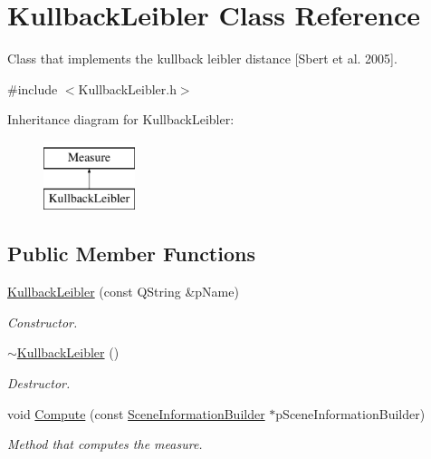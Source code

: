 \hypertarget{class_kullback_leibler}{\section{Kullback\+Leibler Class Reference}
\label{class_kullback_leibler}
}


Class that implements the kullback leibler distance \mbox{[}Sbert et al. 2005\mbox{]}.  




{\ttfamily \#include $<$Kullback\+Leibler.\+h$>$}

Inheritance diagram for Kullback\+Leibler\+:\begin{figure}[H]
\begin{center}
\leavevmode
\includegraphics[height=2.000000cm]{class_kullback_leibler}
\end{center}
\end{figure}
\subsection*{Public Member Functions}
\begin{DoxyCompactItemize}
\item 
\hyperlink{class_kullback_leibler_ac8e06aeaae8976720881a19066e1fb2d}{Kullback\+Leibler} (const Q\+String \&p\+Name)
\begin{DoxyCompactList}\small\item\em Constructor. \end{DoxyCompactList}\item 
\hyperlink{class_kullback_leibler_abbae487fa26946db75c2853064ca5820}{$\sim$\+Kullback\+Leibler} ()
\begin{DoxyCompactList}\small\item\em Destructor. \end{DoxyCompactList}\item 
void \hyperlink{class_kullback_leibler_aa71180b6bc04dc13ed144eddea69c128}{Compute} (const \hyperlink{class_scene_information_builder}{Scene\+Information\+Builder} $\ast$p\+Scene\+Information\+Builder)
\begin{DoxyCompactList}\small\item\em Method that computes the measure. \end{DoxyCompactList}\end{DoxyCompactItemize}
